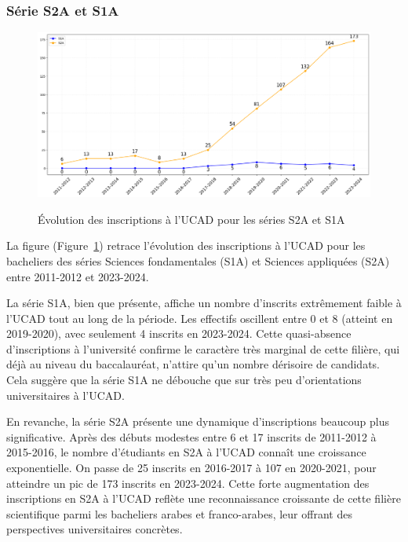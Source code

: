 \newpage
\subsubsection{Série S2A et S1A}

\begin{figure}[ht]
\centering
\caption{Évolution des inscriptions à l'UCAD pour les séries S2A et S1A}
\includegraphics[width=1\textwidth]{figure/Inscrits_ucad_SA.png}
\label{fig:inscrits_ucad_sa}
\end{figure}

La figure (Figure~\ref{fig:inscrits_ucad_sa}) retrace l'évolution des inscriptions à l'UCAD pour les bacheliers des séries Sciences fondamentales (S1A) et Sciences appliquées (S2A) entre 2011-2012 et 2023-2024.

La série S1A, bien que présente, affiche un nombre d'inscrits extrêmement faible à l'UCAD tout au long de la période. Les effectifs oscillent entre 0 et 8 (atteint en 2019-2020), avec seulement 4 inscrits en 2023-2024. 
Cette quasi-absence d'inscriptions à l'université confirme le caractère très marginal de cette filière, qui déjà au niveau du baccalauréat, n'attire qu'un nombre dérisoire de candidats. 
Cela suggère que la série S1A ne débouche que sur très peu d'orientations universitaires à l'UCAD.

En revanche, la série S2A présente une dynamique d'inscriptions beaucoup plus significative. Après des débuts modestes entre 6 et 17 inscrits de 2011-2012 à 2015-2016, le nombre d'étudiants en S2A à l'UCAD connaît une croissance exponentielle. 
On passe de 25 inscrits en 2016-2017 à 107 en 2020-2021, pour atteindre un pic de 173 inscrits en 2023-2024. Cette forte augmentation des inscriptions en S2A à l'UCAD reflète une reconnaissance croissante de cette filière scientifique parmi les bacheliers arabes et franco-arabes, leur offrant des perspectives universitaires concrètes.

